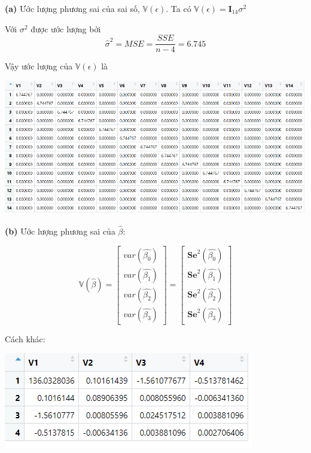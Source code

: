 \documentclass[a4paper]{article}
\theoremstyle{nonumberplain}
\begin{document}
\textbf{(a)} Ước lượng phương sai của sai số, $\mathbb{V}(\epsilon)$. Ta có  $\mathbb{V}(\epsilon) = \mathbf{I}_{14}\sigma^2$

Với $\sigma^2$ được ước lượng bởi 
$$\hat{\sigma}^2 = MSE = \displaystyle \frac{SSE}{n-4} = 6.745$$

Vậy ước lượng của  $\mathbb{V}(\epsilon)$ là 
\begin{center}
\includegraphics[scale = 0.8]{bai3_8a.PNG} 
\end{center}

\textbf{(b)} Ước lượng phương sai của $\hat{\beta}$:

\[\mathbb{V}(\hat{\beta}) = \left[ {\begin{array}{*{20}{c}}
  var(\hat{\beta_0}) \\
  var(\hat{\beta_1})  \\
   var(\hat{\beta_2})\\
 var(\hat{\beta_3})
\end{array}} \right]  = \left[ {\begin{array}{*{20}{c}}
  \mathbf{Se}^2(\hat{\beta_0}) \\
  \mathbf{Se}^2(\hat{\beta_1})  \\
   \mathbf{Se}^2(\hat{\beta_2})\\
 \mathbf{Se}^2(\hat{\beta_3})
\end{array}} \right]\]

Cách khác: 

\begin{center}
\includegraphics{bai3_8b.PNG} 
\end{center}
\end{document}
